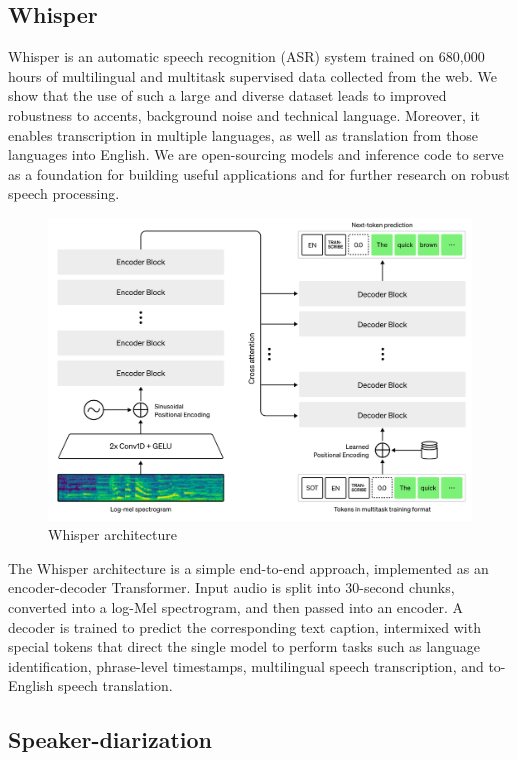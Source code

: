 \documentclass[PMI,VKR]{HSEUniversity}
\begin{document}
\subsection{Whisper}

Whisper is an automatic speech recognition (ASR) system trained on 680,000 hours of multilingual and multitask supervised data collected from the web. 
We show that the use of such a large and diverse dataset leads to improved robustness to accents, background noise and technical language. Moreover, it enables transcription in multiple languages, as well as translation from those languages into English. 
We are open-sourcing models and inference code to serve as a foundation for building useful applications and for further research on robust speech processing.

\begin{figure}[h]
    \centering
    \includegraphics[scale=0.7]{img/whisper.png}
    \caption{Whisper architecture}
\end{figure}

The Whisper architecture is a simple end-to-end approach, implemented as an encoder-decoder Transformer. 
Input audio is split into 30-second chunks, converted into a log-Mel spectrogram, and then passed into an encoder. 
A decoder is trained to predict the corresponding text caption, intermixed with special tokens that direct the single model to perform tasks such as language identification, phrase-level timestamps, multilingual speech transcription, and to-English speech translation.

\subsection{Speaker-diarization}
\end{document}
